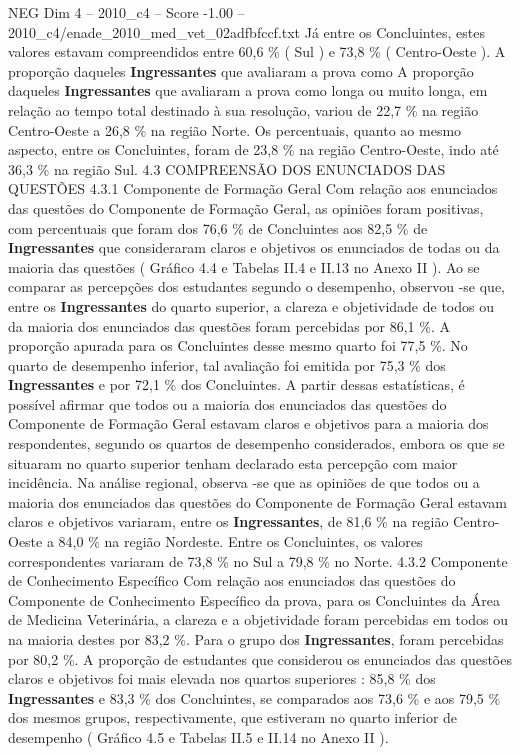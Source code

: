 \begin{textsample}{NEG Dim 4 – 2010\_c4 – Score -1.00 – 2010\_c4/enade\_2010\_med\_vet\_02adfbfccf.txt}
Já entre os Concluintes, estes valores estavam compreendidos entre 60,6 \% ( Sul ) e 73,8 \% ( Centro-Oeste ).
A proporção daqueles \textbf{Ingressantes} que avaliaram a prova como A proporção daqueles \textbf{Ingressantes} que avaliaram a prova como longa ou muito longa, em relação ao tempo total destinado à sua resolução, variou de 22,7 \% na região Centro-Oeste a 26,8 \% na região Norte.
Os percentuais, quanto ao mesmo aspecto, entre os Concluintes, foram de 23,8 \% na região Centro-Oeste, indo até 36,3 \% na região Sul. 4.3 COMPREENSÃO DOS ENUNCIADOS DAS QUESTÕES 4.3.1 Componente de Formação Geral Com relação aos enunciados das questões do Componente de Formação Geral, as opiniões foram positivas, com percentuais que foram dos 76,6 \% de Concluintes aos 82,5 \% de \textbf{Ingressantes} que consideraram claros e objetivos os enunciados de todas ou da maioria das questões ( Gráfico 4.4 e Tabelas II.4 e II.13 no Anexo II ).
Ao se comparar as percepções dos estudantes segundo o desempenho, observou -se que, entre os \textbf{Ingressantes} do quarto superior, a clareza e objetividade de todos ou da maioria dos enunciados das questões foram percebidas por 86,1 \%.
A proporção apurada para os Concluintes desse mesmo quarto foi 77,5 \%.
No quarto de desempenho inferior, tal avaliação foi emitida por 75,3 \% dos \textbf{Ingressantes} e por 72,1 \% dos Concluintes.
A partir dessas estatísticas, é possível afirmar que todos ou a maioria dos enunciados das questões do Componente de Formação Geral estavam claros e objetivos para a maioria dos respondentes, segundo os quartos de desempenho considerados, embora os que se situaram no quarto superior tenham declarado esta percepção com maior incidência.
Na análise regional, observa -se que as opiniões de que todos ou a maioria dos enunciados das questões do Componente de Formação Geral estavam claros e objetivos variaram, entre os \textbf{Ingressantes}, de 81,6 \% na região Centro-Oeste a 84,0 \% na região Nordeste.
Entre os Concluintes, os valores correspondentes variaram de 73,8 \% no Sul a 79,8 \% no Norte. 4.3.2 Componente de Conhecimento Específico Com relação aos enunciados das questões do Componente de Conhecimento Específico da prova, para os Concluintes da Área de Medicina Veterinária, a clareza e a objetividade foram percebidas em todos ou na maioria destes por 83,2 \%.
Para o grupo dos \textbf{Ingressantes}, foram percebidas por 80,2 \%.
A proporção de estudantes que considerou os enunciados das questões claros e objetivos foi mais elevada nos quartos superiores : 85,8 \% dos \textbf{Ingressantes} e 83,3 \% dos Concluintes, se comparados aos 73,6 \% e aos 79,5 \% dos mesmos grupos, respectivamente, que estiveram no quarto inferior de desempenho ( Gráfico 4.5 e Tabelas II.5 e II.14 no Anexo II ).

\end{textsample}
